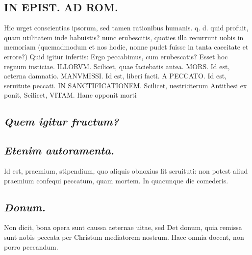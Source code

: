 \documentclass{article}
\begin{document}
\begin{pages}
\section*{IN EPIST. AD ROM.  }
\marginpar{[ p.67 ]}\pstart Hic urget conscientias ipsorum, sed tamen rationibus humanis. q. d. quid profuit, quam utilitatem inde habuistis? nunc erubescitis, quoties illa recurrunt uobis in memoriam (quemadmodum et nos hodie, nonne pudet fuisse in tanta caecitate et errore?) Quid igitur infertis: Ergo peccabimus, cum erubescatis? Esset hoc regnum iusticiae. ILLORVM.  Scilicet, quae faciebatis antea. MORS.  Id est, aeterna damnatio. MANVMISSI.  Id est, liberi facti. A PECCATO. Id est, seruitute peccati. IN SANCTIFICATIONEM. Scilicet, uestri:iterum Antithesi ex ponit, Scilicet, VITAM. Hanc opponit morti\pend
{}
{}
\subsection*{\textit{Quem igitur fructum? }}
{}
\subsection*{\textit{Etenim autoramenta. }}\pstart Id est, praemium, stipendium, quo aliquis obnoxius fit seruituti: non potest aliud praemium confequi peccatum, quam mortem. In quacunque die comederis.   \pend
{}
{}
\subsection*{\textit{Donum. }}\pstart Non dicit, bona opera sunt caussa aeternae uitae, sed Det donum, quia remissa sunt nobis peccata per Christum mediatorem nostrum. Haec omnia docent, non porro peccandum.   \pend

\end{pages}
\end{document}
